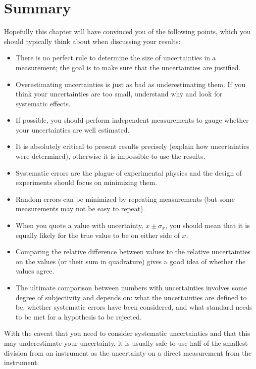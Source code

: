 \section{Summary}
Hopefully this chapter will have convinced you of the following points, which you should typically think about when discussing your results:
\begin{itemize}
\item There is no perfect rule to determine the size of uncertainties in a measurement; the goal is to make sure that the uncertainties are justified.
\item Overestimating uncertainties is just as bad as underestimating them. If you think your uncertainties are too small, understand why and look for systematic effects.
\item If possible, you should perform independent measurements to gauge whether your uncertainties are well estimated.
\item It is absolutely critical to present results precisely (explain how uncertainties were determined), otherwise it is impossible to use the results.
\item Systematic errors are the plague of experimental physics and the design of experiments should focus on minimizing them.
\item Random errors can be minimized by repeating measurements (but some measurements may not be easy to repeat).
\item When you quote a value with uncertainty, $x\pm\sigma_x$, you should mean that it is equally likely for the true value to be on either side of $x$.
\item Comparing the relative difference between values to the relative uncertainties on the values (or their sum in quadrature) gives a good idea of whether the values agree.
\item The ultimate comparison between numbers with uncertainties involves some degree of subjectivity and depends on: what the uncertainties are defined to be, whether systematic errors have been considered, and what standard needs to be met for a hypothesis to be rejected.
\end{itemize}

With the caveat that you need to consider systematic uncertainties and that this may underestimate your uncertainty, it is usually safe to use half of the smallest division from an instrument as the uncertainty on a direct measurement from the instrument. 

